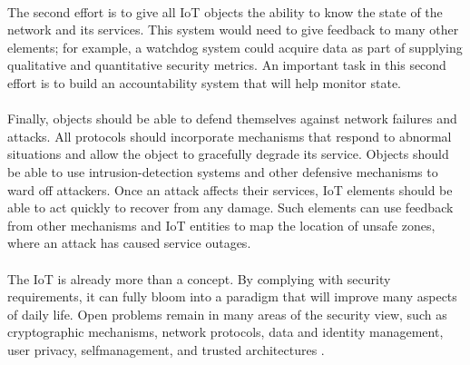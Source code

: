\documentclass[10pt, twocolumn]{article}
\begin{document}
\paragraph{}
The second effort is to give all IoT objects the ability to know the state of the network and its services. This system would need to give feedback to many other elements; for example, a watchdog system could acquire data as part of supplying qualitative and quantitative security metrics. An important task in this second effort is to build an accountability system that will help monitor state. 
\paragraph{}
Finally, objects should be able to defend themselves against network failures and attacks. All protocols should incorporate mechanisms that respond to abnormal situations and allow the object to gracefully degrade its service. Objects should be able to use intrusion-detection systems and other defensive mechanisms to ward off attackers. Once an attack affects their services,
IoT elements should be able to act quickly to recover from any damage. Such elements can use feedback from other mechanisms and IoT entities to map the location of unsafe zones, where an attack has caused service outages.
\paragraph{}
The IoT is already more than a concept. By complying with security requirements, it can fully bloom into a paradigm that will improve many aspects of daily life. Open problems remain in many areas of the security view, such as cryptographic mechanisms, network protocols, data and identity management, user privacy, selfmanagement, and trusted architectures \cite{ref11}. 
\end{document}
